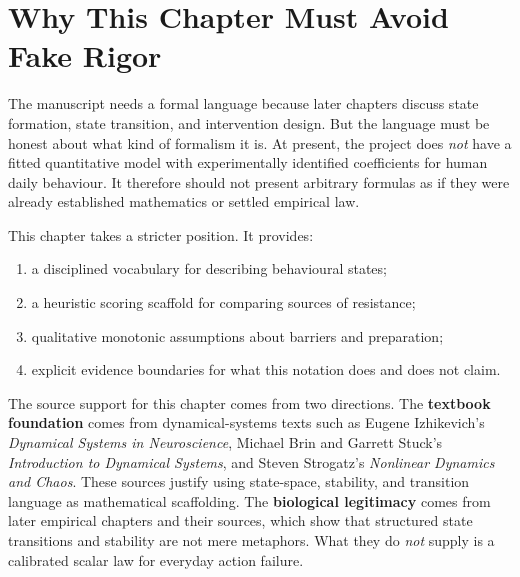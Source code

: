 \section{Why This Chapter Must Avoid Fake Rigor}

The manuscript needs a formal language because later chapters discuss state
formation, state transition, and intervention design. But the language must be
honest about what kind of formalism it is. At present, the project does
\emph{not} have a fitted quantitative model with experimentally identified
coefficients for human daily behaviour. It therefore should not present
arbitrary formulas as if they were already established mathematics or settled
empirical law.

This chapter takes a stricter position. It provides:
\begin{enumerate}[nosep]
  \item a disciplined vocabulary for describing behavioural states;
  \item a heuristic scoring scaffold for comparing sources of resistance;
  \item qualitative monotonic assumptions about barriers and preparation;
  \item explicit evidence boundaries for what this notation does and does not
        claim.
\end{enumerate}

\begin{discussion}
The source support for this chapter comes from two directions. The
\textbf{textbook foundation} comes from dynamical-systems texts such as Eugene
Izhikevich's \emph{Dynamical Systems in Neuroscience}, Michael Brin and Garrett
Stuck's \emph{Introduction to Dynamical Systems}, and Steven Strogatz's
\emph{Nonlinear Dynamics and Chaos}. These sources justify using state-space,
stability, and transition language as mathematical scaffolding. The
\textbf{biological legitimacy} comes from later empirical chapters and their
sources, which show that structured state transitions and stability are not
mere metaphors. What they do \emph{not} supply is a calibrated scalar law for
everyday action failure.
\end{discussion}
